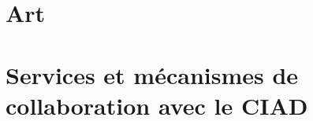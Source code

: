 \begin{bibliographysection}
\part{Art}

\localized

\part{Services et mécanismes de collaboration avec le CIAD}

\localized
\localized

\localized

\appendix

\end{bibliographysection}

\endinput
